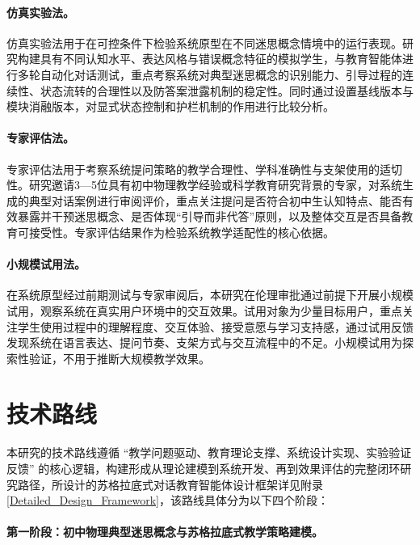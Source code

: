 \paragraph{仿真实验法。}

仿真实验法用于在可控条件下检验系统原型在不同迷思概念情境中的运行表现。研究构建具有不同认知水平、表达风格与错误概念特征的模拟学生，与教育智能体进行多轮自动化对话测试，重点考察系统对典型迷思概念的识别能力、引导过程的连续性、状态流转的合理性以及防答案泄露机制的稳定性。同时通过设置基线版本与模块消融版本，对显式状态控制和护栏机制的作用进行比较分析。

\paragraph{专家评估法。}

专家评估法用于考察系统提问策略的教学合理性、学科准确性与支架使用的适切性。研究邀请3—5位具有初中物理教学经验或科学教育研究背景的专家，对系统生成的典型对话案例进行审阅评价，重点关注提问是否符合初中生认知特点、能否有效暴露并干预迷思概念、是否体现“引导而非代答”原则，以及整体交互是否具备教育可接受性。专家评估结果作为检验系统教学适配性的核心依据。

\paragraph{小规模试用法。}

在系统原型经过前期测试与专家审阅后，本研究在伦理审批通过前提下开展小规模试用，观察系统在真实用户环境中的交互效果。试用对象为少量目标用户，重点关注学生使用过程中的理解程度、交互体验、接受意愿与学习支持感，通过试用反馈发现系统在语言表达、提问节奏、支架方式与交互流程中的不足。小规模试用为探索性验证，不用于推断大规模教学效果。


\section{技术路线}

本研究的技术路线遵循 “教学问题驱动、教育理论支撑、系统设计实现、实验验证反馈” 的核心逻辑，构建形成从理论建模到系统开发、再到效果评估的完整闭环研究路径，所设计的苏格拉底式对话教育智能体设计框架详见附录 \ref {Detailed_Design_Framework}，该路线具体分为以下四个阶段：

\paragraph{第一阶段：初中物理典型迷思概念与苏格拉底式教学策略建模。}

